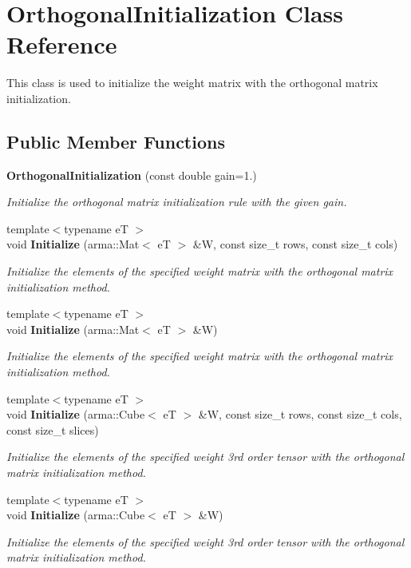 \section{Orthogonal\+Initialization Class Reference}
\label{classmlpack_1_1ann_1_1OrthogonalInitialization}


This class is used to initialize the weight matrix with the orthogonal matrix initialization.  


\subsection*{Public Member Functions}
\begin{DoxyCompactItemize}
\item 
\textbf{ Orthogonal\+Initialization} (const double gain=1.)
\begin{DoxyCompactList}\small\item\em Initialize the orthogonal matrix initialization rule with the given gain. \end{DoxyCompactList}\item 
{\footnotesize template$<$typename eT $>$ }\\void \textbf{ Initialize} (arma\+::\+Mat$<$ eT $>$ \&W, const size\+\_\+t rows, const size\+\_\+t cols)
\begin{DoxyCompactList}\small\item\em Initialize the elements of the specified weight matrix with the orthogonal matrix initialization method. \end{DoxyCompactList}\item 
{\footnotesize template$<$typename eT $>$ }\\void \textbf{ Initialize} (arma\+::\+Mat$<$ eT $>$ \&W)
\begin{DoxyCompactList}\small\item\em Initialize the elements of the specified weight matrix with the orthogonal matrix initialization method. \end{DoxyCompactList}\item 
{\footnotesize template$<$typename eT $>$ }\\void \textbf{ Initialize} (arma\+::\+Cube$<$ eT $>$ \&W, const size\+\_\+t rows, const size\+\_\+t cols, const size\+\_\+t slices)
\begin{DoxyCompactList}\small\item\em Initialize the elements of the specified weight 3rd order tensor with the orthogonal matrix initialization method. \end{DoxyCompactList}\item 
{\footnotesize template$<$typename eT $>$ }\\void \textbf{ Initialize} (arma\+::\+Cube$<$ eT $>$ \&W)
\begin{DoxyCompactList}\small\item\em Initialize the elements of the specified weight 3rd order tensor with the orthogonal matrix initialization method. \end{DoxyCompactList}\end{DoxyCompactItemize}


